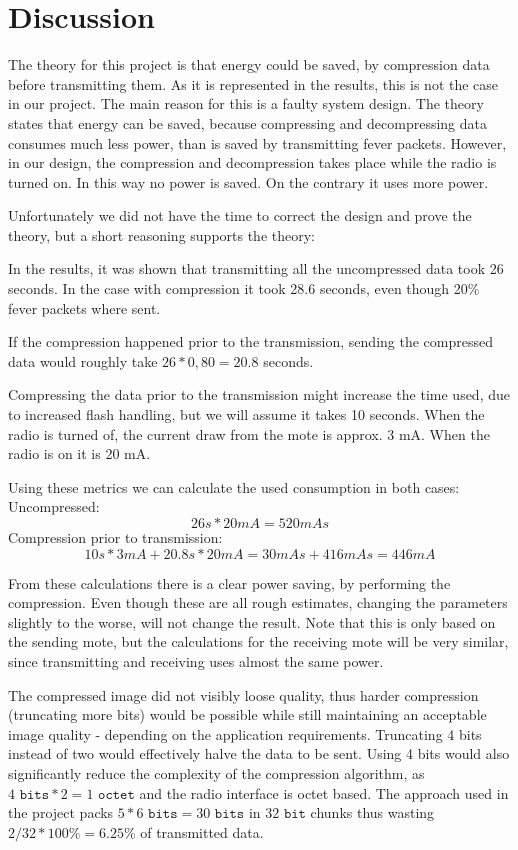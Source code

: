 \chapter{Discussion}

The theory for this project is that energy could be saved, by compression data before transmitting them. As it is represented in the results, this is not the case in our project. The main reason for this is a faulty system design. 
The theory states that energy can be saved, because compressing and decompressing data consumes much less power, than is saved by transmitting fever packets.
However, in our design, the compression and decompression takes place while the radio is turned on. In this way no power is saved. On the contrary it uses more power.

Unfortunately we did not have the time to correct the design and prove the theory, but a short reasoning supports the theory:

In the results, it was shown that transmitting all the uncompressed data took 26 seconds. In the case with compression it took 28.6 seconds, even though 20\% fever packets where sent. 

If the compression happened prior to the transmission, sending the compressed data would roughly take $26*0,80 = 20.8$ seconds. 

Compressing the data prior to the transmission might increase the time used, due to increased flash handling, but we will assume it takes 10 seconds.
When the radio is turned of, the current draw from the mote is approx. 3 mA. When the radio is on it is 20 mA. 

Using these metrics we can calculate the used consumption in both cases:\\
Uncompressed:
\begin{equation}
26 s * 20 mA = 520 mAs
\end{equation}
Compression prior to transmission:
\begin{equation}
10 s * 3 mA + 20.8 s * 20 mA = 30 mAs + 416 mAs  = 446 mA
\end{equation}

From these calculations there is a clear power saving, by performing the compression. Even though these are all rough estimates, changing the parameters slightly to the worse, will not change the result.
Note that this is only based on the sending mote, but the calculations for the receiving mote will be very similar, since transmitting and receiving uses almost the same power.

The compressed image did not visibly loose quality, thus harder compression (truncating more bits) would be possible while still maintaining an acceptable image quality - depending on the application requirements.
Truncating 4 bits instead of two would effectively halve the data to be sent.
Using 4 bits would also significantly reduce the complexity of the compression algorithm, as $4 \texttt{ bits} * 2= 1 \texttt{ octet}$ and the radio interface is octet based.
The approach used in the project packs $5 * 6\texttt{ bits} = 30\texttt{ bits}$ in $32 \texttt{ bit}$ chunks thus wasting $2/32*100\% = 6.25\%$ of transmitted data. 